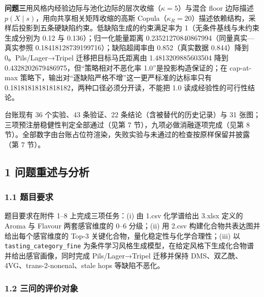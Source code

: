 \documentclass[
  11pt,
]{article}
\newcounter{none} %
\begin{document}
\textbf{问题三}用风格内经验边际与池化边际的层次收缩（\(\kappa=5\)）与混合
floor 边际描述 \(p(X\mid s)\)，用向共享相关矩阵收缩的高斯
Copula（\(\kappa_R=20\)）描述依赖结构，采样后投影到五条硬缺陷约束。低缺陷生成的约束满足率为
1（无条件基线与未约束生成分别为 0.12 与 0.136）；归一化能量距离
0.23521270840867994（同量真实---真实参照
0.18418128739199716）；缺陷超阈率由 0.852（真实数据 0.844）降到
0。Pils/Lager→Tripel 迁移把目标马氏距离由 1.4813209885603504 降到
0.4328202679486975，但``策略相对不恶化率 1.0''是投影构造保证的；在
cap-at-max 策略下，输出对``逐缺陷严格不增''这一更严标准的达标率只有
0.18181818181818182，两种口径必须分开读，不能把 1.0
读成经验性的可行性结论。

台账现有 36 个实验、43 条验证、22 条结论（含被替代的历史记录）与 31
张图；三项预注册稳健性判定全部通过（见第 7
节），九项必做消融逐项完成（见第 8
节）。全部数字由台账占位符渲染，失败实验与未通过的检查按原样保留并披露（第
7 节）。

\subsection{1
问题重述与分析}\label{ux95eeux9898ux91cdux8ff0ux4e0eux5206ux6790}

\subsubsection{1.1 题目要求}\label{ux9898ux76eeux8981ux6c42}

题目要求在附件 1--8 上完成三项任务：(i) 由 1.csv 化学谱给出 3.xlsx
定义的 Aroma 与 Flavour 两套感官维度的 0--6 分级；(ii) 用 2.csv
构建化合物共表达图并给出每个感官维度的 Top-3
关键化合物，量化稳定性与化学合理性；(iii) 以
\texttt{tasting\_category\_fine}
为条件学习风格生成模型，在给定风格下生成化合物谱并给出感官画像，同时完成
Pils/Lager→Tripel 迁移并保持 DMS、双乙酰、4VG、trans-2-nonenal、stale
hops 等缺陷不恶化。

\subsubsection{1.2
三问的评价对象}\label{ux4e09ux95eeux7684ux8bc4ux4ef7ux5bf9ux8c61}
\end{document}
